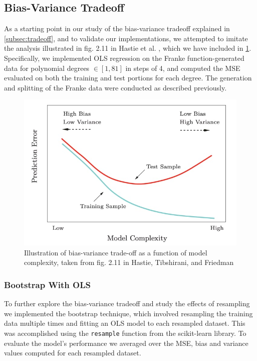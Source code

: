 \documentclass[aps,pra,english,notitlepage,reprint,nofootinbib]{revtex4-1}  %
\begin{document}
\subsection{Bias-Variance Tradeoff}
As a starting point in our study of the bias-variance tradeoff explained in \cref{subsec:tradeoff}, and to validate our implementations, we attempted to imitate the analysis illustrated in fig. 2.11 in Hastie et al. \cite{ESL}, which we have included in \cref{fig:Hastie}. Specifically, we implemented OLS regression on the Franke function-generated data for polynomial degrees $\in[1,81]$ in steps of 4, and computed the MSE evaluated on both the training and test portions for each degree. The generation and splitting of the Franke data were conducted as described previously. 

\begin{figure}
  \centering %
  \includegraphics[width=\columnwidth]{../figs/hastie_bias_variance_tradeoff.jpg}
  \caption{Illustration of bias-variance trade-off as a function of model complexity, taken from fig. 2.11 in Hastie, Tibshirani, and Friedman \cite{ESL}}\label{fig:Hastie}
\end{figure}

\subsubsection{Bootstrap With OLS}
To further explore the bias-variance tradeoff and study the effects of resampling we implemented the bootstrap technique, which involved resampling the training data multiple times and fitting an OLS model to each resampled dataset. This was accomplished using the \verb|resample| function from the scikit-learn library. To evaluate the model's performance we averaged over the MSE, bias and variance values computed for each resampled dataset.
\end{document}
